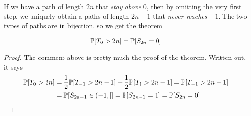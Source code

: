 If we have a path of length $2n$ that \emph{stay above $0$}, then by omitting the very first step, we uniquely obtain a paths of length $2n - 1$ that \emph{never reaches $-1$}.
The two types of paths are in bijection, so we get the theorem
\begin{thm}[]
\begin{align*}
  \mathbb{P}[T_0 > 2n] = \mathbb{P}[S_{2n} = 0]
\end{align*}
\end{thm}
\begin{proof}
The comment above is pretty much the proof of the theorem. 
Written out, it says
\begin{align*}
  \mathbb{P}[T_0 > 2n] &= \frac{1}{2} \mathbb{P}[T_{-1} > 2n -1] + \frac{1}{2}\mathbb{P}[T_1 > 2n - 1] = \mathbb{P}[T_{-1} > 2n -1]\\
                &= \mathbb{P}[S_{2n-1} \in (-1,]] = \mathbb{P}[S_{2n-1} = 1] = \mathbb{P}[S_{2n} = 0]
\end{align*}
\end{proof}
